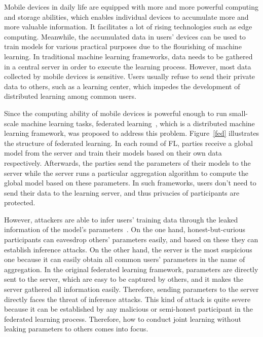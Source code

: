 Mobile devices in daily life are equipped with more and more powerful computing and storage abilities, which enables individual devices to accumulate more and more valuable information. It facilitates a lot of rising technologies such as edge computing. Meanwhile, the accumulated data in users' devices can be used to train models for various practical purposes due to the flourishing of machine learning. In traditional machine learning frameworks, data needs to be gathered in a central server in order to execute the learning process. However, most data collected by mobile devices is sensitive. Users usually refuse to send their private data to others, such as a learning center, which impedes the development of distributed learning among common users.

Since the computing ability of mobile devices is powerful enough to run small-scale machine learning tasks, federated learning~\cite{mcmahan2016communicationefficient}, which is a distributed machine learning framework, was proposed to address this problem. Figure~\ref{fed} illustrates the structure of federated learning. In each round of FL, parties receive a global model from the server and train their models based on their own data respectively. Afterwards, the parties send the parameters of their models to the server while the server runs a particular aggregation algorithm to compute the global model based on these parameters. In such frameworks, users don't need to send their data to the learning server, and thus privacies of participants are protected.

However, attackers are able to infer users' training data through the leaked information of the model's parameters~\cite{Beyond, Leakage, Nasr19}. On the one hand, honest-but-curious participants can eavesdrop others' parameters easily, and based on these they can establish inference attacks. On the other hand, the server is the most suspicious one because it can easily obtain all common users' parameters in the name of aggregation. In the original federated learning framework, parameters are directly sent to the server, which are easy to be captured by others, and it makes the server gathered all information easily. Therefore, sending parameters to the server directly faces the threat of inference attacks. This kind of attack is quite severe because it can be established by any malicious or semi-honest participant in the federated learning process. Therefore, how to conduct joint learning without leaking parameters to others comes into focus.


